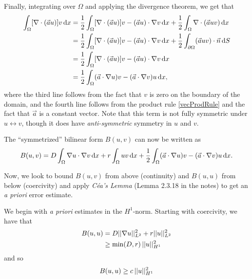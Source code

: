 \begin{solution}
Finally, integrating over $\Omega$ and applying the divergence theorem, we get that
\begin{align*}
\int_\Omega [\nabla \cdot (\vec{a}u)] v \operatorname{d}\!{x}
&= \frac{1}{2} \int_\Omega [\nabla \cdot (\vec{a}u)] v - (\vec{a} u) \cdot \nabla v \operatorname{d}\!{x} + 
\frac{1}{2} \int_\Omega \nabla \cdot (\vec{a} uv) \operatorname{d}\!{x} \\
&= \frac{1}{2} \int_\Omega [\nabla \cdot (\vec{a}u)] v - (\vec{a} u) \cdot \nabla v \operatorname{d}\!{x} +
\frac{1}{2} \int_{\partial\Omega} (\vec{a} uv) \cdot \vec{n} \operatorname{d}\!{S} \\
&= \frac{1}{2} \int_\Omega [\nabla \cdot (\vec{a}u)] v - (\vec{a} u) \cdot \nabla v \operatorname{d}\!{x} \\
&= \frac{1}{2} \int_\Omega (\vec{a} \cdot \nabla u) v - (\vec{a} \cdot \nabla v) u \operatorname{d}\!{x},
\end{align*}
where the third line follows from the fact that $v$ is zero on the boundary of the domain, and the fourth line follows from the product rule \eqref{vecProdRule} and the fact that $\vec{a}$ is a constant vector.
Note that this term is not fully symmetric under $u \leftrightarrow v$, though it does have \textit{anti-symmetric} symmetry in $u$ and $v$.

The ``symmetrized'' bilinear form $B(u,v)$ can now be written as
\begin{align}\label{RAD_weak2}
B(u,v) =
D \int_\Omega \nabla u \cdot \nabla v \operatorname{d}\!{x} +
r \int_\Omega u v \operatorname{d}\!{x} + 
\frac{1}{2} \int_\Omega (\vec{a} \cdot \nabla u) v - (\vec{a} \cdot \nabla v) u \operatorname{d}\!{x}.
\end{align}

Now, we look to bound $B(u,v)$ from above (continuity) and $B(u,u)$ from below (coercivity) and apply \textit{C\'ea's Lemma} (Lemma 2.3.18 in the notes) to get an \textit{a priori} error estimate.

We begin with \textit{a priori} estimates in the $H^1$-norm.
Starting with coercivity, we have that
\begin{align*}
B(u,u) &=
D ||\nabla u||_{L^2}^2 +
r ||u||_{L^2}^2 \\
&\geq
\min(D,r) \, ||u||_{H^1}^2
\end{align*}
and so
\begin{align}\label{H1_coercivity}
B(u,u) \geq c \, ||u||_{H^1}^2
\end{align}


\end{solution}
